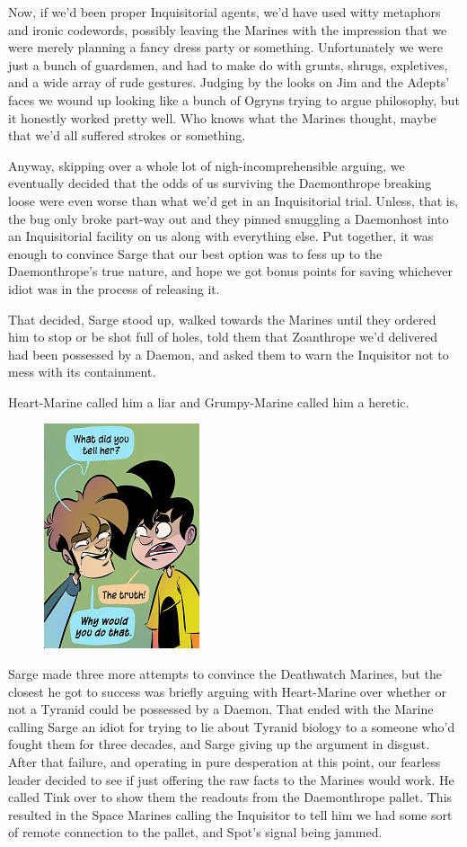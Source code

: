 Now, if we'd been proper Inquisitorial agents, we'd have used witty metaphors and ironic codewords, possibly leaving the Marines with the impression that we were merely planning a fancy dress party or something. 
Unfortunately we were just a bunch of guardsmen, and had to make do with grunts, shrugs, expletives, and a wide array of rude gestures. 
Judging by the looks on Jim and the Adepts' faces we wound up looking like a bunch of Ogryns trying to argue philosophy, but it honestly worked pretty well. 
Who knows what the Marines thought, maybe that we'd all suffered strokes or something.

Anyway, skipping over a whole lot of nigh-incomprehensible arguing, we eventually decided that the odds of us surviving the Daemonthrope breaking loose were even worse than what we'd get in an Inquisitorial trial. 
Unless, that is, the bug only broke part-way out and they pinned smuggling a Daemonhost into an Inquisitorial facility on us along with everything else. 
Put together, it was enough to convince Sarge that our best option was to fess up to the Daemonthrope's true nature, and hope we got bonus points for saving whichever idiot was in the process of releasing it.

That decided, Sarge stood up, walked towards the Marines until they ordered him to stop or be shot full of holes, told them that Zoanthrope we'd delivered had been possessed by a Daemon, and asked them to warn the Inquisitor not to mess with its containment.

Heart-Marine called him a liar and Grumpy-Marine called him a heretic.
\begin{figure}
	\begin{center}
		\includegraphics[width=\figwidth]{pics/16/9.png}
	\end{center}
\end{figure}
Sarge made three more attempts to convince the Deathwatch Marines, but the closest he got to success was briefly arguing with Heart-Marine over whether or not a Tyranid could be possessed by a Daemon. 
That ended with the Marine calling Sarge an idiot for trying to lie about Tyranid biology to a someone who'd fought them for three decades, and Sarge giving up the argument in disgust. 
After that failure, and operating in pure desperation at this point, our fearless leader decided to see if just offering the raw facts to the Marines would work. 
He called Tink over to show them the readouts from the Daemonthrope pallet. 
This resulted in the Space Marines calling the Inquisitor to tell him we had some sort of remote connection to the pallet, and Spot's signal being jammed.

